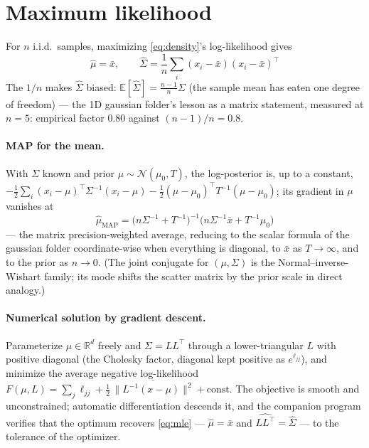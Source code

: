 \documentclass[11pt]{article}
\begin{document}
\section{Maximum likelihood}

For $n$ i.i.d.\ samples, maximizing \eqref{eq:density}'s
log-likelihood gives
\begin{equation}
  \boxed{\;\hat\mu = \bar x, \qquad
  \hat\Sigma = \frac1n \sum_i (x_i - \bar x)(x_i - \bar x)^{\!\top}\;}
  \label{eq:mle}
\end{equation}
The $1/n$ makes $\hat\Sigma$ biased:
$\mathbb{E}[\hat\Sigma] = \frac{n-1}{n}\Sigma$ (the sample mean has
eaten one degree of freedom) --- the 1D gaussian folder's lesson as a
matrix statement, measured at $n = 5$: empirical factor $0.80$ against
$(n-1)/n = 0.8$.

\paragraph{MAP for the mean.} With $\Sigma$ known and prior
$\mu \sim \mathcal{N}(\mu_0, T)$, the log-posterior is, up to a
constant, $-\tfrac12 \sum_i (x_i-\mu)^{\!\top}\Sigma^{-1}(x_i-\mu)
- \tfrac12 (\mu-\mu_0)^{\!\top} T^{-1} (\mu-\mu_0)$; its gradient in
$\mu$ vanishes at
\begin{equation}
  \boxed{\;\hat\mu_{\mathrm{MAP}}
  = \bigl(n\Sigma^{-1} + T^{-1}\bigr)^{-1}
    \bigl(n\Sigma^{-1}\bar x + T^{-1}\mu_0\bigr)\;}
  \label{eq:map}
\end{equation}
--- the matrix precision-weighted average, reducing to the scalar
formula of the gaussian folder coordinate-wise when everything is
diagonal, to $\bar x$ as $T \to \infty$, and to the prior as
$n \to 0$. (The joint conjugate for $(\mu, \Sigma)$ is the
Normal--inverse-Wishart family; its mode shifts the scatter matrix by
the prior scale in direct analogy.)

\paragraph{Numerical solution by gradient descent.} Parameterize
$\mu \in \mathbb{R}^d$ freely and $\Sigma = LL^{\!\top}$ through a
lower-triangular $L$ with positive diagonal (the Cholesky factor,
diagonal kept positive as $e^{\ell_{jj}}$), and minimize the average
negative log-likelihood
$F(\mu, L) = \sum_j \ell_{jj}
+ \tfrac12\,\overline{\|L^{-1}(x-\mu)\|^2} + \text{const}$.
The objective is smooth and unconstrained; automatic differentiation
descends it, and the companion program verifies that the optimum
recovers \eqref{eq:mle} --- $\hat\mu = \bar x$ and
$\widehat{LL^{\!\top}} = \hat\Sigma$ --- to the tolerance of the
optimizer.
\end{document}
